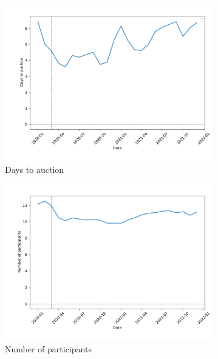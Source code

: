 \documentclass[11pt,a4paper]{article}
\begin{document}
\begin{figure}[h]
  \centering
  \begin{subfigure}[b]{0.49\textwidth}
      \includegraphics[width=0.998\textwidth]{../results/figures/DaysToAuction_mean_mat30_loan1_timeseries_nrmonthly_2.5_4_.pdf}
      \caption{Days to auction}
     \end{subfigure}
     \begin{subfigure}[b]{0.49\textwidth}
      \includegraphics[width=0.998\textwidth]{../results/figures/Number of Participants_mean_mat30_loan1_timeseries_nrmonthly_2.5_4_.pdf}
      \caption{ Number of participants}
     \end{subfigure}
     \begin{subfigure}[b]{0.49\textwidth}

\end{subfigure}
\end{figure}
\end{document}
